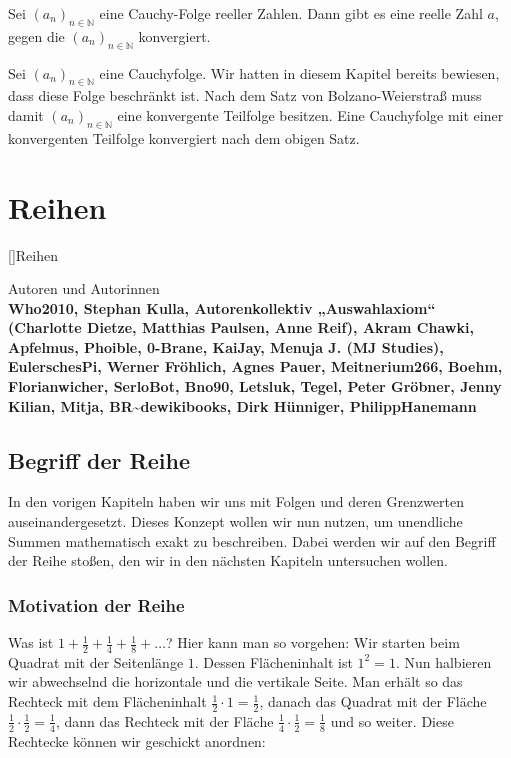 \documentclass[fontsize=9pt,
               parskip=half-,
               DIV=14,
               listof=chapterentry,
               tocflat]{scrbook}
\newenvironment{authors}{\par\vspace*{\fill}\color{white}Autoren und
Autorinnen\\\bfseries}{\clearpage}
\begin{document}
\begin{theorem*}
Sei $(a_{n})_{n\in \mathbb {N} }$ eine Cauchy-Folge reeller Zahlen. Dann gibt es eine reelle Zahl $a$, gegen die $(a_{n})_{n\in \mathbb {N} }$ konvergiert.

\end{theorem*}

\begin{proof*}
Sei $(a_{n})_{n\in \mathbb {N} }$ eine Cauchyfolge. Wir hatten in diesem Kapitel bereits bewiesen, dass diese Folge beschränkt ist. Nach dem Satz von Bolzano-Weierstraß muss damit $(a_{n})_{n\in \mathbb {N} }$ eine konvergente Teilfolge besitzen. Eine Cauchyfolge mit einer konvergenten Teilfolge konvergiert nach dem obigen Satz.

\end{proof*}

\part{Reihen}

[]{Reihen}\begin{authors}
Who2010, Stephan Kulla, Autorenkollektiv „Auswahlaxiom“ (Charlotte Dietze, Matthias Paulsen, Anne Reif), Akram Chawki, Apfelmus, Phoible, 0-Brane, KaiJay, Menuja J. (MJ Studies), EulerschesPi, Werner Fröhlich, Agnes Pauer, Meitnerium266, Boehm, Florianwicher, SerloBot, Bno90, Letsluk, Tegel, Peter Gröbner, Jenny Kilian, Mitja, BR\textasciitilde{}dewikibooks, Dirk Hünniger, PhilippHanemann\end{authors}

\chapter{Begriff der Reihe}

In den vorigen Kapiteln haben wir uns mit Folgen und deren Grenzwerten auseinandergesetzt. Dieses Konzept wollen wir nun nutzen, um unendliche Summen mathematisch exakt zu beschreiben. Dabei werden wir auf den Begriff der Reihe stoßen, den wir in den nächsten Kapiteln untersuchen wollen.

\section{Motivation der Reihe}

Was ist $1+{\tfrac {1}{2}}+{\tfrac {1}{4}}+{\tfrac {1}{8}}+\ldots $? Hier kann man so vorgehen: Wir starten beim Quadrat mit der Seitenlänge $1$. Dessen Flächeninhalt ist $1^{2}=1$. Nun halbieren wir abwechselnd die horizontale und die vertikale Seite. Man erhält so das Rechteck mit dem Flächeninhalt ${\tfrac {1}{2}}\cdot 1={\tfrac {1}{2}}$, danach das Quadrat mit der Fläche ${\tfrac {1}{2}}\cdot {\tfrac {1}{2}}={\tfrac {1}{4}}$, dann das Rechteck mit der Fläche ${\tfrac {1}{4}}\cdot {\tfrac {1}{2}}={\tfrac {1}{8}}$ und so weiter. Diese Rechtecke können wir geschickt anordnen:
\end{document}
